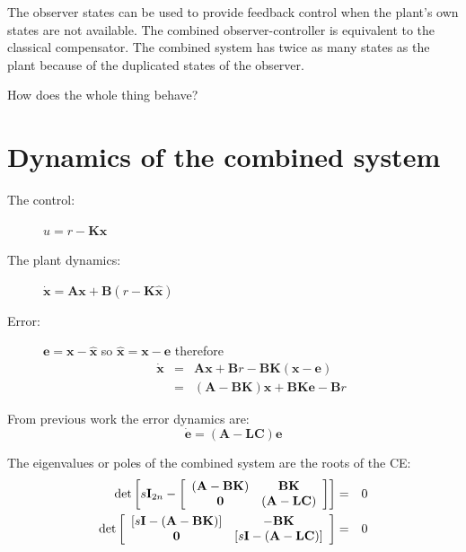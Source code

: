 \def\FileDate{10/04/02}
\def\FileVersion{1.0}

The observer states can be used to provide feedback control when the plant’s own states are not available. The combined observer-controller is equivalent to the classical compensator. The combined system has twice as many states as the plant because of the duplicated states of the observer. 

How does the whole thing behave?

\section*{Dynamics of the combined system} %
\label{sub:dynamics_of_the_combined_system}


 
\begin{description}
	\item[The control:] $u=r-\mathbf{K}\hat{\mathbf{x}}$
	\item[The plant dynamics:] $\dot{\mathbf{x}}=\mathbf{A}\mathbf{x}+\mathbf{B}(r-\mathbf{K}\hat{\mathbf{x}})$
	\item[Error:] $\mathbf{e}=\mathbf{x}-\hat{\mathbf{x}}$ so $\hat{\mathbf{x}}=\mathbf{x}-\mathbf{e}$ therefore
	\begin{eqnarray*}
			\dot{\mathbf{x}} & = & \mathbf{A}\mathbf{x}+\mathbf{B}r-\mathbf{BK}(\mathbf{x}-\mathbf{e}) \\
			                 & = & (\mathbf{A}-\mathbf{BK})\mathbf{x}+\mathbf{BK}\mathbf{e}-\mathbf{B}r
	\end{eqnarray*}
\end{description}

From previous work the error dynamics are:
\[
\dot{\mathbf{e}} = (\mathbf{A}-\mathbf{LC})\mathbf{e}
\]


The eigenvalues or poles of the combined system are the roots of the CE:
\begin{eqnarray*}
	\det \left[ {s{\bf{I}}_{2n}  - \left[ {\begin{array}{*{20}c}
	   {\left( {{\bf{A}} - {\bf{BK}}} \right)} & {{\bf{BK}}}  \\
	   {\bf{0}} & {\left( {{\bf{A}} - {\bf{LC}}} \right)}  \\
	\end{array}} \right]} \right] & = &  0 \\
	\det \left[ {\begin{array}{*{20}c}
	   {\left[ {s{\bf{I}} - \left( {{\bf{A}} - {\bf{BK}}} \right)} \right]} & { - {\bf{BK}}}  \\
	   {\bf{0}} & {\left[ {s{\bf{I}} - \left( {{\bf{A}} - {\bf{LC}}} \right)} \right]}  \\
	\end{array}} \right] & = & 0
\end{eqnarray*}
 
